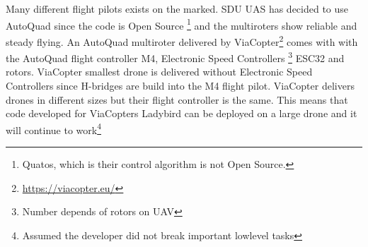 Many different flight pilots exists on the marked. SDU UAS has decided to use AutoQuad since the code is Open Source \footnote{Quatos, which is their control algorithm is not Open Source.} and the multiroters show reliable and steady flying. An AutoQuad multiroter delivered by ViaCopter\footnote{\url{https://viacopter.eu/}} comes with with the AutoQuad flight controller M4, Electronic Speed Controllers \footnote{Number depends of rotors on UAV} ESC32 and rotors. ViaCopter smallest drone is delivered without Electronic Speed Controllers since H-bridges are build into the M4 flight pilot.
ViaCopter delivers drones in different sizes but their flight controller is the same. This means that code developed for ViaCopters Ladybird can be deployed on a large drone and it will continue to work\footnote{Assumed the developer did not break important lowlevel tasks}

